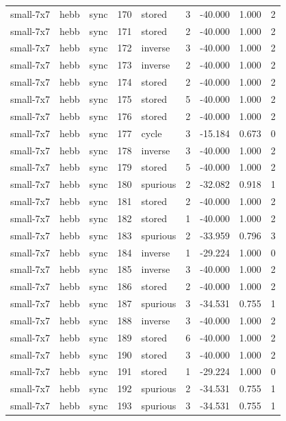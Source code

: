 \begin{tabular}{lllrlrrrr}
small-7x7 & hebb & sync & 170 & stored & 3 & -40.000 & 1.000 & 2 \\
small-7x7 & hebb & sync & 171 & stored & 2 & -40.000 & 1.000 & 2 \\
small-7x7 & hebb & sync & 172 & inverse & 3 & -40.000 & 1.000 & 2 \\
small-7x7 & hebb & sync & 173 & inverse & 2 & -40.000 & 1.000 & 2 \\
small-7x7 & hebb & sync & 174 & stored & 2 & -40.000 & 1.000 & 2 \\
small-7x7 & hebb & sync & 175 & stored & 5 & -40.000 & 1.000 & 2 \\
small-7x7 & hebb & sync & 176 & stored & 2 & -40.000 & 1.000 & 2 \\
small-7x7 & hebb & sync & 177 & cycle & 3 & -15.184 & 0.673 & 0 \\
small-7x7 & hebb & sync & 178 & inverse & 3 & -40.000 & 1.000 & 2 \\
small-7x7 & hebb & sync & 179 & stored & 5 & -40.000 & 1.000 & 2 \\
small-7x7 & hebb & sync & 180 & spurious & 2 & -32.082 & 0.918 & 1 \\
small-7x7 & hebb & sync & 181 & stored & 2 & -40.000 & 1.000 & 2 \\
small-7x7 & hebb & sync & 182 & stored & 1 & -40.000 & 1.000 & 2 \\
small-7x7 & hebb & sync & 183 & spurious & 2 & -33.959 & 0.796 & 3 \\
small-7x7 & hebb & sync & 184 & inverse & 1 & -29.224 & 1.000 & 0 \\
small-7x7 & hebb & sync & 185 & inverse & 3 & -40.000 & 1.000 & 2 \\
small-7x7 & hebb & sync & 186 & stored & 2 & -40.000 & 1.000 & 2 \\
small-7x7 & hebb & sync & 187 & spurious & 3 & -34.531 & 0.755 & 1 \\
small-7x7 & hebb & sync & 188 & inverse & 3 & -40.000 & 1.000 & 2 \\
small-7x7 & hebb & sync & 189 & stored & 6 & -40.000 & 1.000 & 2 \\
small-7x7 & hebb & sync & 190 & stored & 3 & -40.000 & 1.000 & 2 \\
small-7x7 & hebb & sync & 191 & stored & 1 & -29.224 & 1.000 & 0 \\
small-7x7 & hebb & sync & 192 & spurious & 2 & -34.531 & 0.755 & 1 \\
small-7x7 & hebb & sync & 193 & spurious & 3 & -34.531 & 0.755 & 1 \\

\end{tabular}

